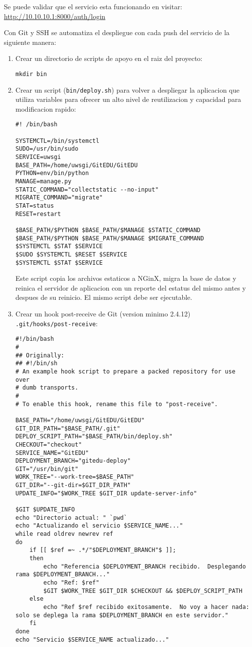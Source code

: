 Se puede validar que el servicio esta funcionando en visitar: \url{http://10.10.10.1:8000/auth/login}

Con Git y SSH se automatiza el despliegue con cada push del servicio de la siguiente manera:
\begin{enumerate}
	\item Crear un directorio de scripts de apoyo en el raiz del proyecto:
    \begin{lstlisting}
mkdir bin
    \end{lstlisting}
    \item Crear un script (\texttt{bin/deploy.sh}) para volver a despliegar la aplicacion que utiliza variables para ofrecer un alto nivel de reutilizacion y capacidad para modificacion rapido:
    \begin{lstlisting}
#! /bin/bash

SYSTEMCTL=/bin/systemctl
SUDO=/usr/bin/sudo
SERVICE=uwsgi
BASE_PATH=/home/uwsgi/GitEDU/GitEDU
PYTHON=env/bin/python
MANAGE=manage.py
STATIC_COMMAND="collectstatic --no-input"
MIGRATE_COMMAND="migrate"
STAT=status
RESET=restart

$BASE_PATH/$PYTHON $BASE_PATH/$MANAGE $STATIC_COMMAND
$BASE_PATH/$PYTHON $BASE_PATH/$MANAGE $MIGRATE_COMMAND
$SYSTEMCTL $STAT $SERVICE
$SUDO $SYSTEMCTL $RESET $SERVICE
$SYSTEMCTL $STAT $SERVICE
    \end{lstlisting}
    Este script copia los archivos estaticos a NGinX, migra la base de datos y reinica el servidor de aplicacion con un reporte del estatus del mismo antes y despues de su reinicio. El mismo script debe ser ejecutable.
    \item Crear un hook post-receive de Git (version minimo 2.4.12) \\
    \texttt{.git/hooks/post-receive}:
    \begin{lstlisting}[breaklines=true]
#!/bin/bash
#
## Originally:
## #!/bin/sh
# An example hook script to prepare a packed repository for use over
# dumb transports.
#
# To enable this hook, rename this file to "post-receive".

BASE_PATH="/home/uwsgi/GitEDU/GitEDU"
GIT_DIR_PATH="$BASE_PATH/.git"
DEPLOY_SCRIPT_PATH="$BASE_PATH/bin/deploy.sh"
CHECKOUT="checkout"
SERVICE_NAME="GitEDU"
DEPLOYMENT_BRANCH="gitedu-deploy"
GIT="/usr/bin/git"
WORK_TREE="--work-tree=$BASE_PATH"
GIT_DIR="--git-dir=$GIT_DIR_PATH"
UPDATE_INFO="$WORK_TREE $GIT_DIR update-server-info"

$GIT $UPDATE_INFO
echo "Directorio actual: " `pwd`
echo "Actualizando el servicio $SERVICE_NAME..."
while read oldrev newrev ref
do
    if [[ $ref =~ .*/"$DEPLOYMENT_BRANCH"$ ]];
    then
        echo "Referencia $DEPLOYMENT_BRANCH recibido.  Desplegando rama $DEPLOYMENT_BRANCH..."
        echo "Ref: $ref"
        $GIT $WORK_TREE $GIT_DIR $CHECKOUT && $DEPLOY_SCRIPT_PATH
    else
        echo "Ref $ref recibido exitosamente.  No voy a hacer nada: solo se deplega la rama $DEPLOYMENT_BRANCH en este servidor."
    fi
done
echo "Servicio $SERVICE_NAME actualizado..."


\end{lstlisting}
\end{enumerate}

